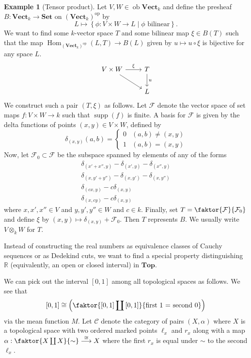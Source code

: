 \documentclass[10pt,letterpaper,cm]{nupset}
\theoremstyle{definition}
\newtheorem{exmp}[definition]{Example}
\theoremstyle{theorem}
\theoremstyle{remark}
\newcommand{\R}{\mathbb R}
\newcommand{\1}{\mathbf{1}}
\renewcommand{\c}{\mathscr{C}}
\newcommand{\0}{\vec 0}
\DeclareMathOperator{\op}{op}
\DeclareMathOperator{\ob}{ob}
\DeclareMathOperator{\Hom}{Hom}
\DeclareMathOperator{\supp}{supp}
\begin{document}
\begin{exmp}[Tensor product]
Let $V, W \in \ob \mathbf{Vect}_k$ and define the presheaf $B: \mathbf{Vect}_k \to \mathbf{Set}$ on $\left( \mathbf{Vect}_k\right)^{\op}$ by $$L \mapsto \left\{ \phi : V \times W \to L \mid \phi \text{ bilinear}\right\}.$$ We want to find some $k$-vector space $T$ and some bilinear map $\xi \in B(T)$ such that the map $\Hom_{\left( \mathbf{Vect}_k\right)^{\op}}(L, T) \to B(L)$ given by $u \mapsto u \circ \xi$ is bijective for any space $L$. 
\[
\begin{tikzcd}
V \times W \arrow[r, "\xi"] \arrow[rd] & T \arrow[d, "u"] \\
 & L
\end{tikzcd}
\]
We construct such a pair $\left(T, \xi\right)$ as follows. Let $\mathcal{F}$ denote the vector space of set maps $f: V \times W \to k$ such that $\supp(f)$ is finite. A basis for $\mathcal{F}$ is given by the delta functions of points $\left(x,y\right) \in V \times W$, defined by
\[ \delta_{(x,y)}(a, b) = \begin{cases}
0 & \left(a,b\right) \ne \left(x,y\right) \\
1 & \left(a, b\right) = \left(x,y\right)
\end{cases}
\]
Now, let $\mathcal{F}_0 \subset \mathcal{F}$ be the subspace spanned by elements of any of the forms
\begin{gather*}
 \delta_{(x' + x'', y)} - \delta_{(x', y)} - \delta_{(x'', y)} 
 \\ \delta_{(x, y' + y'')} - \delta_{(x, y')} - \delta_{(x, y'')} 
\\ \delta_{(cx, y)} - c\delta_{(x,y)}  
\\\delta_{(x,cy)} -c \delta_{(x,y)} 
\end{gather*}
where $x, x', x'' \in V$ and $y, y', y'' \in W$ and $c \in k$. Finally, set $T = \faktor{\mathcal{F}}{\mathcal{F}_0}$ and define $\xi$ by  $\left(x,y\right) \mapsto \delta_{(x,y)} + \mathcal{F}_0$. Then $T$ represents $B$. We usually write $V \otimes_k W$ for $T$.
\end{exmp}

\bigskip

 Instead of constructing the real numbers as equivalence classes of Cauchy sequences or as Dedekind cuts, we want to find a special property distinguishing $\R$ (equivalently, an open or closed interval) in  $\mathbf{Top}$. 

We can pick out the interval $\left[0,1\right]$ among all topological spaces as follows. We see that $$\left[0,1\right]\cong \left( \faktor{\left[0,1\right] \coprod \left[0,1\right]}{\text{first 1 = second 0}} \right)$$ via the mean function $M$. Let $\c$ denote the category of pairs $\left(X, \alpha\right)$ where $X$ is a topological space with two ordered marked points $\ell_x$ and $r_x$  along with a map $\alpha :  \faktor{X \coprod X}{\sim} \overset{\cong}{\longrightarrow} X$ where the first $r_x$ is equal under $\sim$ to the second $\ell_x$.
 
\end{document}
